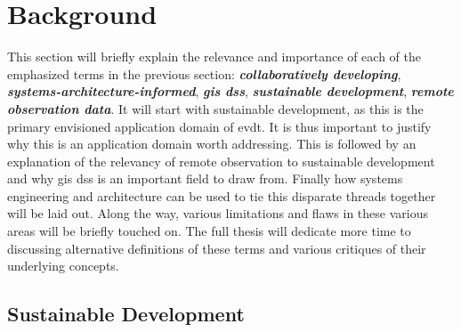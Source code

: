 \documentclass[notitlepage]{article}
\begin{document}
\section{Background} \label{sec:background}

This section will briefly explain the relevance and importance of each of the emphasized terms in the previous section: \textbf{\textit{collaboratively developing}}, \textbf{\textit{systems-architecture-informed}}, \textbf{\textit{\ac{gis} \ac{dss}}}, \textbf{\textit{sustainable development}}, \textbf{\textit{remote observation data}}. It will start with sustainable development, as this is the primary envisioned application domain of \ac{evdt}. It is thus important to justify why this is an application domain worth addressing. This is followed by an explanation of the relevancy of remote observation to sustainable development and why \ac{gis} \ac{dss} is an important field to draw from. Finally how systems engineering and architecture can be used to tie this disparate threads together will be laid out. Along the way, various limitations and flaws in these various areas will be briefly touched on. The full thesis will dedicate more time to discussing alternative definitions of these terms and various critiques of their underlying concepts.

\subsection{Sustainable Development} \label{sec:sustain}
\end{document}
